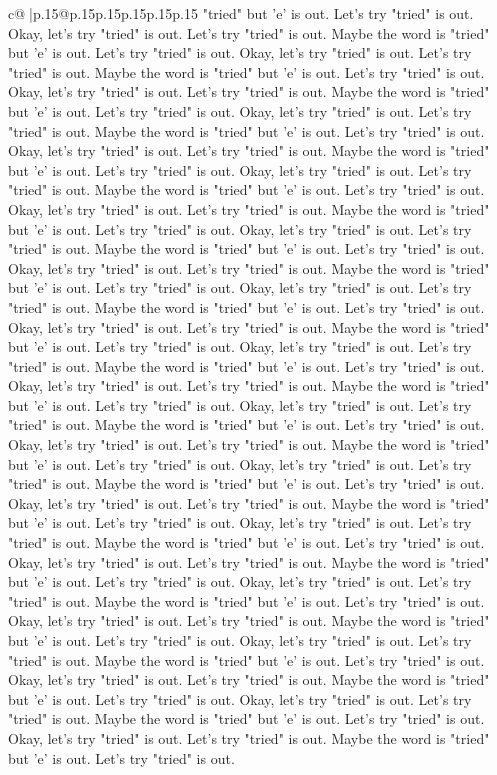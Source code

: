 \documentclass{article}
\begin{document}
{\begin{supertabular}{c@{$\;$}|p{.15\linewidth}@{}p{.15\linewidth}p{.15\linewidth}p{.15\linewidth}p{.15\linewidth}p{.15\linewidth}}
{{{"tried" but 'e' is out. Let's try "tried" is out. Okay, let's try "tried" is out. Let's try "tried" is out. Maybe the word is "tried" but 'e' is out. Let's try "tried" is out. Okay, let's try "tried" is out. Let's try "tried" is out. Maybe the word is "tried" but 'e' is out. Let's try "tried" is out. Okay, let's try "tried" is out. Let's try "tried" is out. Maybe the word is "tried" but 'e' is out. Let's try "tried" is out. Okay, let's try "tried" is out. Let's try "tried" is out. Maybe the word is "tried" but 'e' is out. Let's try "tried" is out. Okay, let's try "tried" is out. Let's try "tried" is out. Maybe the word is "tried" but 'e' is out. Let's try "tried" is out. Okay, let's try "tried" is out. Let's try "tried" is out. Maybe the word is "tried" but 'e' is out. Let's try "tried" is out. Okay, let's try "tried" is out. Let's try "tried" is out. Maybe the word is "tried" but 'e' is out. Let's try "tried" is out. Okay, let's try "tried" is out. Let's try "tried" is out. Maybe the word is "tried" but 'e' is out. Let's try "tried" is out. Okay, let's try "tried" is out. Let's try "tried" is out. Maybe the word is "tried" but 'e' is out. Let's try "tried" is out. Okay, let's try "tried" is out. Let's try "tried" is out. Maybe the word is "tried" but 'e' is out. Let's try "tried" is out. Okay, let's try "tried" is out. Let's try "tried" is out. Maybe the word is "tried" but 'e' is out. Let's try "tried" is out. Okay, let's try "tried" is out. Let's try "tried" is out. Maybe the word is "tried" but 'e' is out. Let's try "tried" is out. Okay, let's try "tried" is out. Let's try "tried" is out. Maybe the word is "tried" but 'e' is out. Let's try "tried" is out. Okay, let's try "tried" is out. Let's try "tried" is out. Maybe the word is "tried" but 'e' is out. Let's try "tried" is out. Okay, let's try "tried" is out. Let's try "tried" is out. Maybe the word is "tried" but 'e' is out. Let's try "tried" is out. Okay, let's try "tried" is out. Let's try "tried" is out. Maybe the word is "tried" but 'e' is out. Let's try "tried" is out. Okay, let's try "tried" is out. Let's try "tried" is out. Maybe the word is "tried" but 'e' is out. Let's try "tried" is out. Okay, let's try "tried" is out. Let's try "tried" is out. Maybe the word is "tried" but 'e' is out. Let's try "tried" is out. Okay, let's try "tried" is out. Let's try "tried" is out. Maybe the word is "tried" but 'e' is out. Let's try "tried" is out. Okay, let's try "tried" is out. Let's try "tried" is out. Maybe the word is "tried" but 'e' is out. Let's try "tried" is out. Okay, let's try "tried" is out. Let's try "tried" is out. Maybe the word is "tried" but 'e' is out. Let's try "tried" is out. Okay, let's try "tried" is out. Let's try "tried" is out. Maybe the word is "tried" but 'e' is out. Let's try "tried" is out. Okay, let's try "tried" is out. Let's try "tried" is out. Maybe the word is "tried" but 'e' is out. Let's try "tried" is out. Okay, let's try "tried" is out. Let's try "tried" is out. Maybe the word is "tried" but 'e' is out. Let's try "tried" is out. Okay, let's try "tried" is out. Let's try "tried" is out. Maybe the word is "tried" but 'e' is out. Let's try "tried" is out. }}}
\end{supertabular}}
\end{document}
